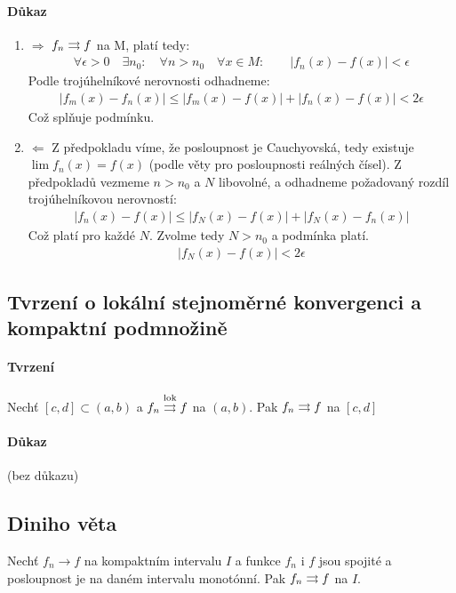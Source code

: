 \documentclass[a4paper,10pt]{article}
\begin{document}
\paragraph{Důkaz}
\begin{enumerate}
	\item $\Rightarrow$ $f_n \rightrightarrows f$ na M, platí tedy:
	\begin{align}
		\forall \epsilon > 0 \quad \exists n_0: \quad \forall n > n_0 \quad
		\forall x \in M: \qquad |f_n(x) - f(x)| < \epsilon
	\end{align}
	Podle trojúhelníkové nerovnosti odhadneme:
	\begin{align}
		|f_m(x) - f_n(x)| \le |f_m(x) - f(x)| + |f_n(x) - f(x)| < 2\epsilon
	\end{align}
	Což splňuje podmínku.
	\item $\Leftarrow$ Z předpokladu víme, že posloupnost je Cauchyovská, tedy
	existuje $\lim f_n(x) = f(x)$ (podle věty pro posloupnosti reálných čísel).
	Z předpokladů vezmeme $n > n_0$ a $N$ libovolné, a odhadneme požadovaný
	rozdíl trojúhelníkovou nerovností:
	\begin{align}
		|f_n(x) - f(x) | \le |f_N(x) - f(x)| + |f_N(x) - f_n(x)|
	\end{align}
	Což platí pro každé $N$. Zvolme tedy $N > n_0$ a podmínka platí.
	\begin{align}
		|f_N(x) - f(x)| < 2\epsilon
	\end{align}
\end{enumerate}



\subsection{Tvrzení o lokální stejnoměrné konvergenci a kompaktní podmnožině}
\setcounter{equation}{0}
\paragraph{Tvrzení}
Nechť $[c,d] \subset (a,b)$ a $f_n \overset{\text{lok}}{\rightrightarrows} f$ na $(a,b)$. Pak $f_n \rightrightarrows f$ na
$[c,d]$
\paragraph{Důkaz}
(bez důkazu)
\subsection{Diniho věta}
\setcounter{equation}{0}
Nechť $f_n \to f$ na kompaktním intervalu $I$ a funkce $f_n$ i $f$ jsou spojité
a posloupnost je na daném intervalu monotónní. Pak $f_n \rightrightarrows f$ na $I$.
\end{document}
